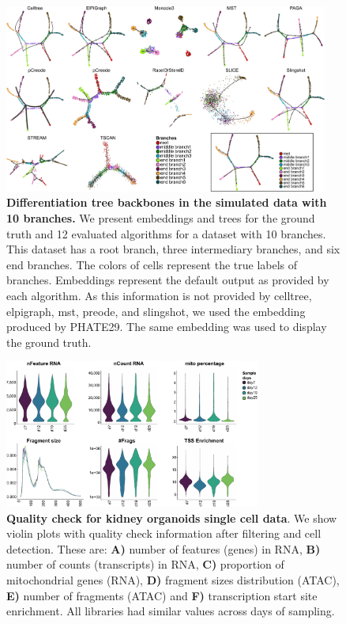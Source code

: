 \begin{figure}[!ht]
  \centering
  \includegraphics[width=0.95\textwidth]{DLA10/fig}
  \vspace{0.1cm}
  \caption[Differentiation tree backbones in the simulated data with 10 branches.]{\textbf{Differentiation tree backbones in the simulated data with 10 branches.} We present embeddings and trees for the ground truth and 12 evaluated algorithms for a dataset with 10 branches. This dataset has a root branch, three intermediary branches, and six end branches. The colors of cells represent the true labels of branches. Embeddings represent the default output as provided by each algorithm. As this information is not provided by celltree, elpigraph, mst, preode, and slingshot, we used the embedding produced by PHATE29. The same embedding was used to display the ground truth.}
  \label{supfig:dla10}
\end{figure}



\begin{figure}[!ht]
  \centering
  \includegraphics[width=0.75\textwidth]{kidney_QC//fig}
  \vspace{0.1cm}
  \caption[Kidney organoid quality check.]{\textbf{Quality check for kidney organoids single cell data}. We show violin plots with quality check information after filtering and cell detection. These are: \textbf{A)} number of features (genes) in RNA, \textbf{B)} number of counts (transcripts) in RNA, \textbf{C)} proportion of mitochondrial genes (RNA), \textbf{D)} fragment sizes distribution (ATAC), \textbf{E)} number of fragments (ATAC) and \textbf{F)} transcription start site enrichment. All libraries had similar values across days of sampling. }
  \label{supfig:kidney-qc}
\end{figure}

